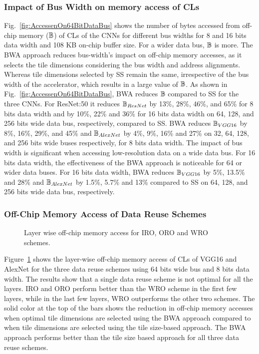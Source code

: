 \subsubsection{Impact of Bus Width on memory access of CLs}
Fig.~\ref{fig:AccessenOn64BitDataBus} shows the number of bytes accessed from off-chip memory ($\mathbb{B}$) of CLs of the CNNs for different bus widths for 8 and 16 bits data width and 108 KB on-chip buffer size. For a wider data bus, $\mathbb{B}$ is more. The BWA approach reduces bus-width's impact on off-chip memory accesses, as it selects the tile dimensions considering the bus width and address alignments. Whereas tile dimensions selected by SS remain the same, irrespective of the bus width of the accelerator, which results in a large value of $\mathbb{B}$.
As shown in Fig.~\ref{fig:AccessenOn64BitDataBus}, BWA reduces $\mathbb{B}$ compared to SS for the three CNNs. For ResNet:50 it reduces $\mathbb{B}_{ResNet}$ by 13\%, 28\%, 46\%, and 65\% for 8 bits data width and by 10\%, 22\% and 36\% for 16 bits data width on 64, 128, and 256 bits wide data bus, respectively, compared to SS. 
BWA reduces $\mathbb{B}_{VGG16}$ by 8\%, 16\%, 29\%, and 45\% and $\mathbb{B}_{AlexNet}$ by 4\%, 9\%, 16\% and 27\% on 32, 64, 128, and 256 bits wide buses respectively, for 8 bits data width. 
The impact of bus width is significant when accessing low-resolution data on a wide data bus. For 16 bits data width, the effectiveness of the BWA approach is noticeable for 64 or wider data buses. For 16 bits data width, BWA reduces $\mathbb{B}_{VGG16}$ by 5\%, 13.5\% and 28\% and $\mathbb{B}_{AlexNet}$ by 1.5\%, 5.7\% and 13\% compared to SS on 64, 128, and 256 bits wide data bus, respectively.
\subsubsection{Off-Chip Memory Access of Data Reuse  Schemes}\label{sec:ResultsDataReuseScheme}
\begin{figure}[htb]
	\centering
	\hfil
	\hfil	
	\caption{Layer wise off-chip memory access for IRO, ORO and WRO schemes.}
	\label{fig:DataReuseSchemeCompare}
	\vspace{-1.0em}	
\end{figure}
Figure~\ref{fig:DataReuseSchemeCompare} shows the layer-wise off-chip memory access of CLs of VGG16 and AlexNet for the three data reuse schemes using 64 bits wide bus and 8 bits data width. The results show that a single data reuse scheme is not optimal for all the layers. IRO and ORO perform better than the WRO scheme in the first few layers, while in the last few layers, WRO outperforms the other two schemes. The solid color at the top of the bars shows the reduction in off-chip memory accesses when optimal tile dimensions are selected using the BWA approach compared to when tile dimensions are selected using the tile size-based approach. The BWA approach performs better than the tile size based approach for all three data reuse schemes.
